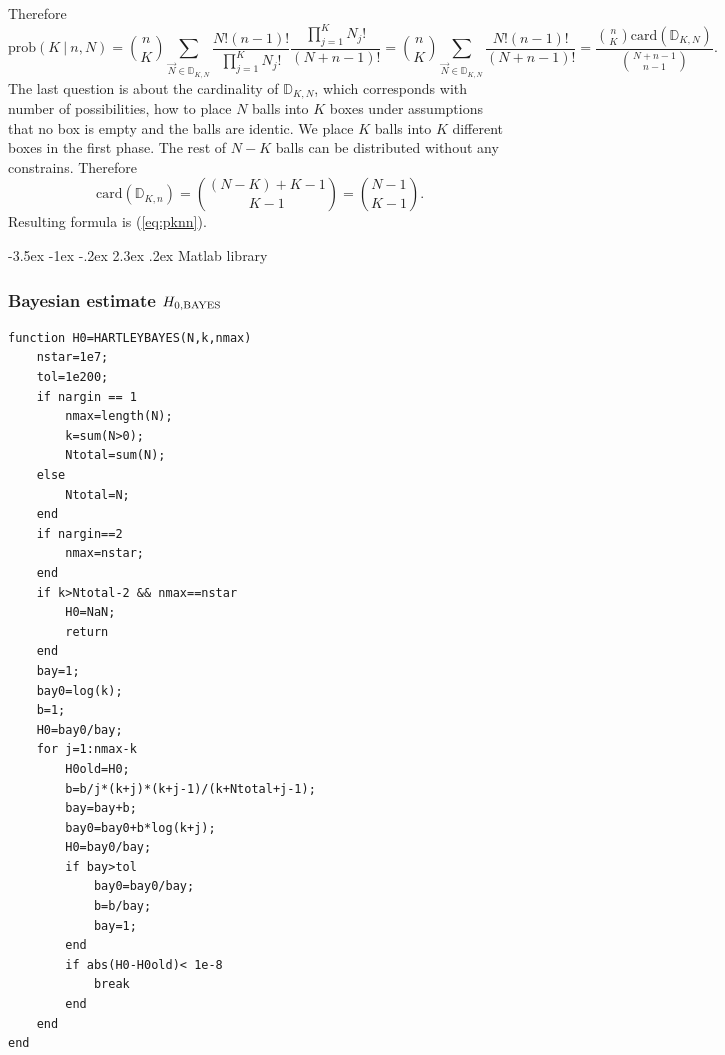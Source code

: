 \documentclass[a4paper,10pt]{article}
\makeatletter
\renewcommand\subsection{\@startsection {subsection}{1}{\z@}%
                                   {-3.5ex \@plus -1ex \@minus -.2ex}%
                                   {2.3ex \@plus.2ex}%
                                   {\normalsize\bfseries}}
\makeatother
\begin{document}
\begin{appendices}
\begin{equation}
\end{equation}
Therefore
\begin{equation} 
\label{eq:prob}
\text{prob}(K \: | \: n,N) = {n \choose K}\sum_{\vec{N} \in \mathbb{D}_{K,N}} \frac{N!(n-1)!}{\prod_{j=1}^{K}N_{j}!}\frac{\prod_{j=1}^{K}N_{j}!}{(N+n-1)!} = {n \choose K}\sum_{\vec{N} \in \mathbb{D}_{K,N}} \frac{N!(n-1)!}{(N+n-1)!} = \frac{{n \choose K}\text{card}(\mathbb{D}_{K,N})}{{N+n-1 \choose n-1}}.
\end{equation}
The last question is about the cardinality of $\mathbb{D}_{K,N}$, which corresponds with number of possibilities, how to place $N$ balls into $K$ boxes under assumptions that no box is empty and the balls are identic. We place $K$ balls into $K$ different boxes in the first phase. The rest of $N-K$ balls can be distributed without any constrains. Therefore
\begin{equation} 
\label{eq:card}
\text{card}(\mathbb{D}_{K,n}) = {(N-K)+K-1 \choose K-1} = {N-1 \choose K-1}. 
\end{equation}
Resulting formula is (\ref{eq:pknn}).



\subsection{Matlab library}

\subsubsection{Bayesian estimate $ H_{0,\mbox{\scriptsize{BAYES}}}$ }
\ttfamily
\begin{lstlisting}
function H0=HARTLEYBAYES(N,k,nmax)
    nstar=1e7;
    tol=1e200; 
    if nargin == 1
        nmax=length(N);
        k=sum(N>0);
        Ntotal=sum(N);
    else
        Ntotal=N;
    end
    if nargin==2
        nmax=nstar;
    end
    if k>Ntotal-2 && nmax==nstar
        H0=NaN;
        return
    end
    bay=1;
    bay0=log(k);
    b=1;
    H0=bay0/bay;
    for j=1:nmax-k
        H0old=H0;
        b=b/j*(k+j)*(k+j-1)/(k+Ntotal+j-1);
        bay=bay+b;
        bay0=bay0+b*log(k+j);
        H0=bay0/bay;
        if bay>tol
            bay0=bay0/bay;
            b=b/bay;
            bay=1;
        end
        if abs(H0-H0old)< 1e-8
            break
        end
    end
end
\end{lstlisting}

\normalfont

\end{appendices}
\end{document}

